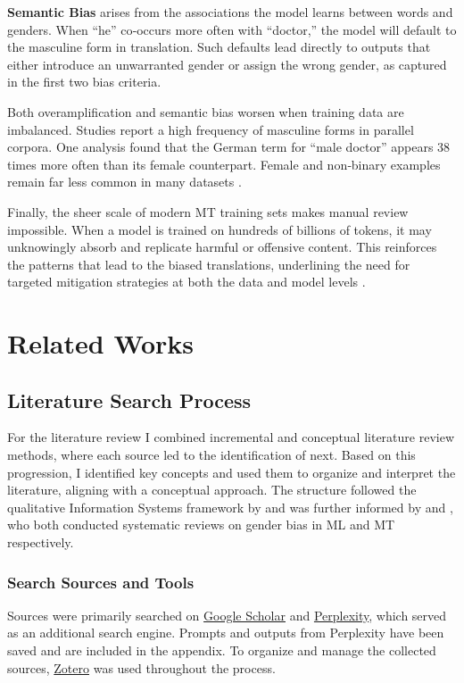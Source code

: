    \textbf{ Semantic Bias} arises from the associations the model learns between words and genders. When “he” co‑occurs more often with “doctor,” the model will default to the masculine form in translation. Such defaults lead directly to outputs that either introduce an unwarranted gender or assign the wrong gender, as captured in the first two bias criteria. 
    
    Both overamplification and semantic bias worsen when training data are imbalanced. Studies report a high frequency of masculine forms in parallel corpora. One analysis found that the German term for “male doctor” appears 38 times more often than its female counterpart. Female and non‑binary examples remain far less common in many datasets \citep{ullmannGenderBiasMachine2022,stanczakSurveyGenderBias2021}.

    Finally, the sheer scale of modern MT training sets makes manual review impossible. When a model is trained on hundreds of billions of tokens, it may unknowingly absorb and replicate harmful or offensive content. This reinforces the patterns that lead to the biased translations, underlining the need for targeted mitigation strategies at both the data and model levels \citep{ullmannGenderBiasMachine2022}.


\section{Related Works}

    \subsection{Literature Search Process}
        For the literature review I combined incremental and conceptual literature review methods, where each source led to the identification of next. Based on this progression, I identified key concepts and used them to organize and interpret the literature, aligning with a conceptual approach. The structure followed the qualitative Information Systems framework by \citet{schryenWritingQualitativeLiterature2015} and was further informed by \citet{shresthaExploringGenderBiases2022} and \citet{savoldiDecadeGenderBias2025}, who both conducted systematic reviews on gender bias in ML and MT respectively. 

        \subsubsection{Search Sources and Tools}
        Sources were primarily searched on \href{https://scholar.google.com/}{Google Scholar} and \href{https://www.perplexity.ai/}{Perplexity}, which served as an additional search engine. Prompts and outputs from Perplexity have been saved and are included in the appendix. To organize and manage the collected sources, \href{https://www.zotero.org/}{Zotero} was used throughout the process.

